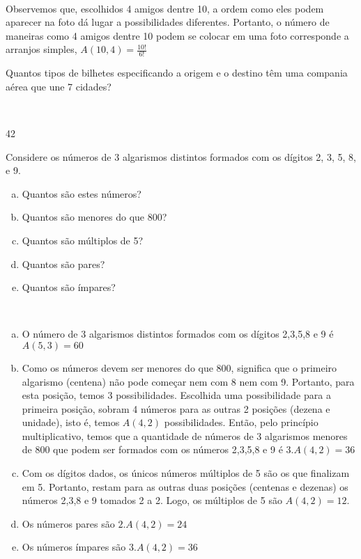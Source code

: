 \documentclass[a4paper, 12pt, addpoints]{exam}
\begin{document}
\begin{questions}
\begin{resp}~

  Observemos que, escolhidos 4 amigos dentre 10, a ordem como eles podem aparecer na foto dá lugar a possibilidades diferentes. Portanto, o número de maneiras como 4 amigos dentre 10 podem se colocar em uma foto corresponde a arranjos simples, $A(10,4) = \frac{10!}{6!}$
\end{resp}

\question Quantos tipos de bilhetes especificando a origem e o destino têm uma compania aérea que une 7 cidades?

\begin{resp}~

  42
\end{resp}

\question Considere os números de 3 algarismos distintos formados com os dígitos 2, 3, 5, 8, e 9.

    \begin{enumerate}[a)]
        \item Quantos são estes números?
        \item Quantos são menores do que 800?
        \item Quantos são múltiplos de 5?
        \item Quantos são pares?
        \item Quantos são ímpares?
    \end{enumerate}

    \begin{resp}~

      \begin{enumerate}[a)]
        \item O número de 3 algarismos distintos formados com os dígitos 2,3,5,8 e 9 é $A(5,3) = 60$
        \item Como os números devem ser menores do que 800, significa que o primeiro algarismo (centena) não pode começar nem com 8 nem com 9. Portanto, para esta posição, temos 3 possibilidades. Escolhida uma possibilidade para a primeira posição, sobram 4 números para as outras 2 posições (dezena e unidade), isto é, temos $A(4,2)$ possibilidades. Então, pelo princípio multiplicativo, temos que a quantidade de números de 3 algarismos menores de 800 que podem ser formados com os números 2,3,5,8 e 9 é $ 3. A(4,2) = 36$
        \item Com os dígitos dados, os únicos números múltiplos de 5 são os que finalizam em 5. Portanto, restam para as outras duas posições (centenas e dezenas) os números 2,3,8 e 9 tomados 2 a 2. Logo, os múltiplos de 5 são $A(4,2) = 12$.
        \item Os números pares são $2.A(4,2) = 24$
        \item Os números ímpares são $3.A(4,2) = 36$
    \end{enumerate}
    \end{resp}


\end{questions}
\end{document}
